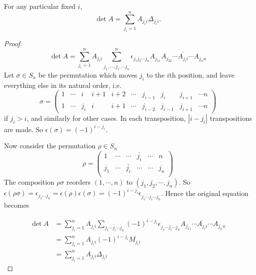 \documentclass[a4paper]{article}
\begin{document}
\begin{thm}
  For any particular fixed $i$,
  \[
  \det A = \sum_{j_i = 1}^{n} A_{j_ii}\Delta_{j_ii}.
  \]
\end{thm}
\begin{proof}
  \[
  \det A = \sum_{j_i = 1}^nA_{j_ii} \sum_{j_1, \cdots, \overline{j_i}, \cdots j_n}^n \epsilon_{j_1j_2\cdots j_n} A_{j_11}A_{j_22}\cdots \overline{A_{j_ii}}\cdots A_{j_nn}
  \]
  Let $\sigma \in S_n$ be the permutation which moves $j_i$ to the $i$th position, and leave everything else in its natural order, i.e.
  \[
  \sigma =
  \begin{pmatrix}
    1 &\cdots& i & i + 1 & i + 2 & \cdots &j_{i - 1}&j_i& j_{i + 1} & \cdots n\\
    1 & \cdots & j_i & i & i + 1 & \cdots & j_{i - 2} & j_{i - 1} & j_{i + 1} & \cdots n
  \end{pmatrix}
  \]
  if $j_i > i$, and similarly for other cases. In each transposition, $|i - j_i|$ transpositions are made. So $\epsilon(\sigma) = (-1)^{i - j_i}$.

  Now consider the permutation $\rho\in S_n$
  \[
  \rho =
  \begin{pmatrix}
    1 & \cdots & \cdots & \bar {j_i} & \cdots & n\\
    j_1 & \cdots & \bar{j_i} & \cdots & \cdots & j_n\\
  \end{pmatrix}
  \]
  The composition $\rho\sigma$ reorders $(1, \cdots, n)$  to $(j_1, j_2,\cdots, j_n)$. So $\epsilon(\rho\sigma) = \epsilon_{j_1\cdots j_n} = \epsilon(\rho)\epsilon(\sigma) = (-1)^{i - j_i} \epsilon_{j_1\cdots \bar j_i \cdots j_n}$. Hence the original equation becomes

\begin{align*}
  \det A &= \sum_{j_i = 1}^n A_{j_i i} \sum_{j_1\cdots \bar j_i\cdots j_n}(-1)^{i - j_i} \epsilon_{j_1\cdots \bar j_i \cdots j_n} A_{j_11}\cdots \overline{A_{j_ii}} \cdots A_{j_nn}\\
  &= \sum_{j_i = 1}^n A_{j_ii} (-1)^{i - j_i}M_{j_ii}\\
  &= \sum_{j_i = 1}^{n} A_{j_ii}\Delta_{j_ii}
\end{align*}
\end{proof}
\end{document}
